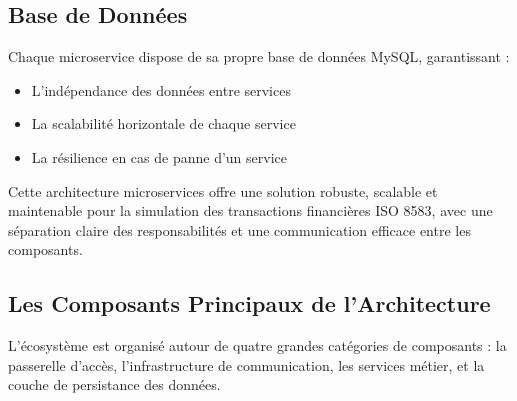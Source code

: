 \subsection{Base de Données}
Chaque microservice dispose de sa propre base de données MySQL, garantissant :
\begin{itemize}[label=\textbullet]
    \item L'indépendance des données entre services
    \item La scalabilité horizontale de chaque service
    \item La résilience en cas de panne d'un service
\end{itemize}

Cette architecture microservices offre une solution robuste, scalable et maintenable pour la simulation des transactions financières ISO 8583, avec une séparation claire des responsabilités et une communication efficace entre les composants.

\subsection{Les Composants Principaux de l'Architecture}

L'écosystème est organisé autour de quatre grandes catégories de composants : la passerelle d'accès, l'infrastructure de communication, les services métier, et la couche de persistance des données.


